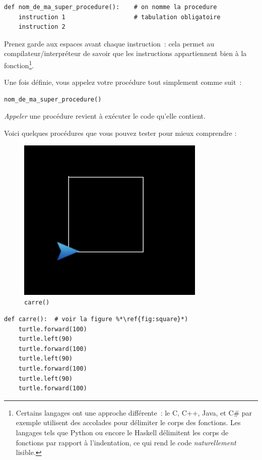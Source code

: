 \documentclass[11pt,a4paper]{article}
\begin{document}
\begin{lstlisting}
def nom_de_ma_super_procedure():    # on nomme la procedure
    instruction 1                   # tabulation obligatoire
    instruction 2
\end{lstlisting}

Prenez garde aux espaces avant chaque instruction~: cela permet au
compilateur/interpréteur de savoir que les instructions appartiennent
bien à la fonction\footnote{Certains langages ont une approche différente~: le
C, C++, Java, et C\# par exemple utilisent des accolades pour délimiter le corps
des fonctions. Les langages tels que Python ou encore le Haskell délimitent les
corps de fonctions par rapport à l'indentation, ce qui rend le code
\emph{naturellement} lisible.}.

Une fois définie, vous appelez votre procédure tout simplement comme
suit~:

\begin{lstlisting}
nom_de_ma_super_procedure()
\end{lstlisting}

\emph{Appeler} une procédure revient à exécuter le code qu'elle contient.

Voici quelques procédures que vous pouvez tester pour mieux comprendre :

\begin{figure}
    \centering
    \includegraphics[width=0.8\textwidth]{img/square}
    \caption{\lstinline{carre()}}
    \label{fig:square}
\end{figure}

\begin{lstlisting}[float]
def carre():  # voir la figure %*\ref{fig:square}*)
    turtle.forward(100)
    turtle.left(90)
    turtle.forward(100)
    turtle.left(90)
    turtle.forward(100)
    turtle.left(90)
    turtle.forward(100)
\end{lstlisting}
\newpage
\end{document}
